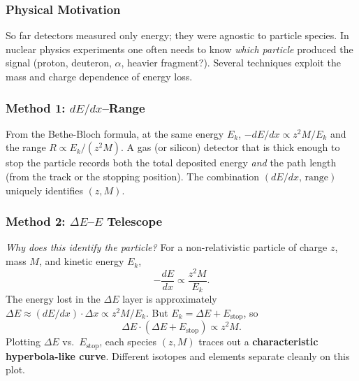 \subsubsection*{Physical Motivation}
So far detectors measured only energy; they were agnostic to particle species.
In nuclear physics experiments one often needs to know \emph{which particle}
produced the signal (proton, deuteron, $\alpha$, heavier fragment?).
Several techniques exploit the mass and charge dependence of energy loss.

\subsubsection*{Method 1: $dE/dx$–Range}

From the Bethe-Bloch formula, at the same energy $E_k$,
$-dE/dx \propto z^2 M / E_k$ and the range $R \propto E_k/(z^2 M)$.
A gas (or silicon) detector that is thick enough to stop the particle
records both the total deposited energy \emph{and} the path length
(from the track or the stopping position).  The combination
$(dE/dx,\, \text{range})$ uniquely identifies $(z, M)$.

\subsubsection*{Method 2: $\Delta E$–$E$ Telescope}


\textit{Why does this identify the particle?}
For a non-relativistic particle of charge $z$, mass $M$, and kinetic energy $E_k$,
\begin{equation}
  \label{eq:lec07:dEdx_telescope}
  -\frac{dE}{dx} \propto \frac{z^2 M}{E_k}.
\end{equation}
The energy lost in the $\Delta E$ layer is approximately
$\Delta E \approx (dE/dx)\cdot\Delta x \propto z^2 M / E_k$.
But $E_k = \Delta E + E_\text{stop}$, so
\begin{equation}
  \label{eq:lec07:dEE_relation}
  \Delta E \cdot (\Delta E + E_\text{stop}) \propto z^2 M.
\end{equation}
Plotting $\Delta E$ vs.\ $E_\text{stop}$, each species $(z, M)$ traces out a
\textbf{characteristic hyperbola-like curve}.  Different isotopes and elements
separate cleanly on this plot.

